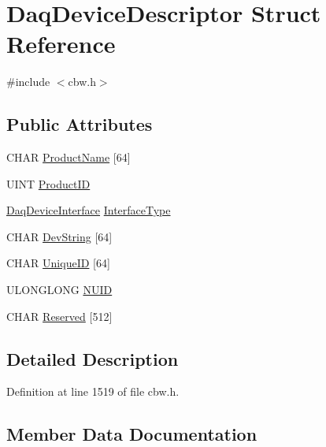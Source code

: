 \hypertarget{struct_daq_device_descriptor}{}\section{Daq\+Device\+Descriptor Struct Reference}
\label{struct_daq_device_descriptor}


{\ttfamily \#include $<$cbw.\+h$>$}

\subsection*{Public Attributes}
\begin{DoxyCompactItemize}
\item 
C\+H\+AR \hyperlink{struct_daq_device_descriptor_a7af4f8a2ea731e6cbb069ce2e1c87fec}{Product\+Name} \mbox{[}64\mbox{]}
\item 
U\+I\+NT \hyperlink{struct_daq_device_descriptor_a7b493a9562ca2f53bf9b25bd75cb32ea}{Product\+ID}
\item 
\hyperlink{cbw_8h_a0610a4d934ce35393b4260e5de14d60e}{Daq\+Device\+Interface} \hyperlink{struct_daq_device_descriptor_a6f76f2cd8a8895a8bf31a0cde68b682f}{Interface\+Type}
\item 
C\+H\+AR \hyperlink{struct_daq_device_descriptor_a879fc7487d3aa08a233886735cac5ee6}{Dev\+String} \mbox{[}64\mbox{]}
\item 
C\+H\+AR \hyperlink{struct_daq_device_descriptor_a9e3f88648eb606baa0922fa0526abe24}{Unique\+ID} \mbox{[}64\mbox{]}
\item 
U\+L\+O\+N\+G\+L\+O\+NG \hyperlink{struct_daq_device_descriptor_a65b5f17bc537370aed75eaf58b1b804f}{N\+U\+ID}
\item 
C\+H\+AR \hyperlink{struct_daq_device_descriptor_a53cec846e1dc3556f4fdceadce9c30d8}{Reserved} \mbox{[}512\mbox{]}
\end{DoxyCompactItemize}


\subsection{Detailed Description}


Definition at line 1519 of file cbw.\+h.



\subsection{Member Data Documentation}
\mbox{\label{struct_daq_device_descriptor_a879fc7487d3aa08a233886735cac5ee6}} 
